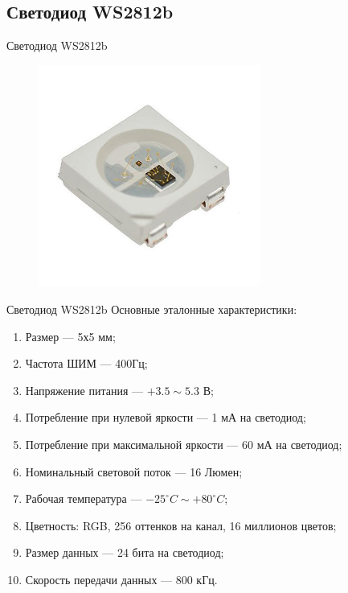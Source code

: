 
\subsection{Светодиод WS2812b}

\begin{frame}{Светодиод WS2812b}
  \begin{figure}
    \centering
    \includegraphics[width=0.65\textwidth]{assets/images/ws2812__general.jpg}
  \end{figure}
\end{frame}

\begin{frame}{Светодиод WS2812b}
  Основные эталонные характеристики:
  \begin{enumerate}
    \item Размер --- 5х5 мм;
    \item Частота ШИМ --- 400Гц;
    \item Напряжение питания --- $+3.5 \sim 5.3$ В;
    \item Потребление при нулевой яркости --- 1 мА на светодиод;
    \item Потребление при максимальной яркости --- 60 мА на светодиод;
    \item Номинальный световой поток --- 16 Люмен;
    \item Рабочая температура --- $-25^\circ C \sim +80^\circ C$;
    \item Цветность: RGB, 256 оттенков на канал, 16 миллионов цветов;
    \item Размер данных --- 24 бита на светодиод;
    \item Скорость передачи данных --- 800 кГц.
  \end{enumerate}
\end{frame}


